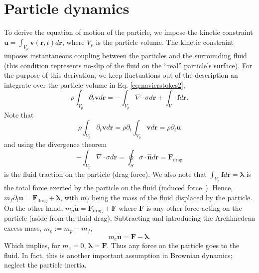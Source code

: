\documentclass[ twoside,openright,titlepage,numbers=noenddot,%
headinclude,footinclude,cleardoublepage=empty,abstract=on,
BCOR=5mm,paper=b5,fontsize=11pt, dvipsnames
]{scrreprt}
\renewcommand{\vec}[1]{\bm{#1}}
\newcommand{\tens}[1]{\bm{\mathcal{#1}}}
\newcommand{\pvel}{u}
\newcommand{\fpos}{r}
\newcommand{\fvel}{v}
\begin{document}
\section*{Particle dynamics}
To derive the equation of motion of the particle, we impose the kinetic constraint $\vec{u} = \int_{V_p}\vec{\fvel}(\vec{\fpos}, t)d\vec{\fpos}$, where $V_p$ is the particle volume. The kinetic constraint imposes instantaneous coupling between the particles and the surrounding fluid (this condition represents no-slip of the fluid on the ``real'' particle's surface). For the purpose of this derivation, we keep fluctuations out of the description an integrate over the particle volume in Eq. \eqref{eq:navierstokes2},
\begin{equation}
  \rho\int_{V_p}\partial_t\vec{\fvel}d\vec{\fpos} = -\int_{V_p}\nabla\cdot\tens{\sigma}d\vec{r} + \int_V\vec{f}d\vec{\fpos}.
\end{equation}
Note that
$$\rho\int_{V_p}\partial_t\vec{\fvel}d\vec{\fpos} = \rho \partial_t\int_{V_p}\vec{\fvel}d\vec{\fpos} = \rho\partial_t\vec{\pvel}$$
and using the divergence theorem
$$
-\int_{V_p}\nabla\cdot\tens{\sigma}d\vec{\fpos} = \oint_S\tens{\sigma}\cdot\hat{\vec{n}}d\vec{r} = \vec{F}_{\text{drag}}
$$
is the fluid traction on the particle (drag force).
We also note that $\int_{V_p}\vec{f}d\vec{\fpos} = \vec{\lambda}$ is the total force exerted by the particle on the fluid (induced force~\cite{Mazur1974}).
Hence, $m_f\partial_t\vec{\pvel} = \vec{F}_{\text{drag}} + \vec{\lambda}$, with $m_f$ being the mass of the fluid displaced by the particle.
On the other hand, $m_p\dot{\vec{\pvel}} = \vec{F}_{\text{drag}} + \vec{F}$ where $\vec{F}$ is any other force acting on the particle (aside from the fluid drag). Subtracting and introducing the Archimedean excess mass,  $m_e := m_p - m_f$,
\begin{equation}
  m_e\dot{\vec{\pvel}} = \vec{F} - \vec{\lambda}.
\end{equation}
Which implies, for $m_e = 0$, $\vec{\lambda}=\vec{F}$. Thus any force on the particle goes to the fluid. In fact, this is another important assumption in Brownian dynamics; neglect the particle inertia.
\end{document}
